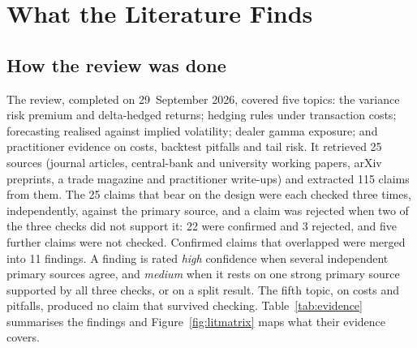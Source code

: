 \documentclass[10pt, a4paper, twocolumn]{article}
\begin{document}
\section{What the Literature Finds}
\label{sec:lit}

\subsection{How the review was done}

The review, completed on 29~September 2026, covered five topics: the variance risk premium and delta-hedged returns; hedging rules under transaction costs; forecasting realised against implied volatility; dealer gamma exposure; and practitioner evidence on costs, backtest pitfalls and tail risk. It retrieved 25 sources (journal articles, central-bank and university working papers, arXiv preprints, a trade magazine and practitioner write-ups) and extracted 115 claims from them. The 25 claims that bear on the design were each checked three times, independently, against the primary source, and a claim was rejected when two of the three checks did not support it: 22 were confirmed and 3 rejected, and five further claims were not checked. Confirmed claims that overlapped were merged into 11 findings. A finding is rated \emph{high} confidence when several independent primary sources agree, and \emph{medium} when it rests on one strong primary source supported by all three checks, or on a split result. The fifth topic, on costs and pitfalls, produced no claim that survived checking. Table~\ref{tab:evidence} summarises the findings and Figure~\ref{fig:litmatrix} maps what their evidence covers.
\end{document}
